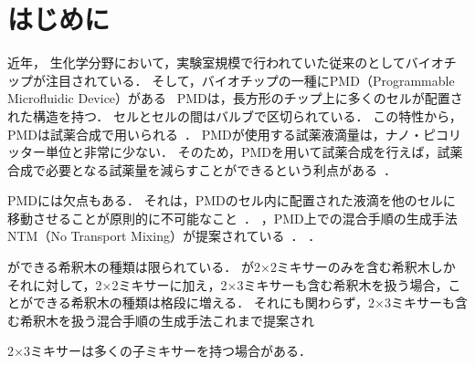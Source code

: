 \chapter{はじめに}
近年， 生化学分野において，実験室規模で行われていた従来のとしてバイオチップが注目されている．
そして，バイオチップの一種にPMD（Programmable Microfluidic Device）がある~\cite{1}
PMDは，長方形のチップ上に多くのセルが配置された構造を持つ．
セルとセルの間はバルブで区切られている．
この特性から，PMDは試薬合成で用いられる~\cite{2}．
PMDが使用する試薬液滴量は，ナノ・ピコリッター単位と非常に少ない．
そのため，PMDを用いて試薬合成を行えば，試薬合成で必要となる試薬量を減らすことができるという利点がある~\cite{1}．

PMDには欠点もある．
それは，PMDのセル内に配置された液滴を他のセルに移動させることが原則的に不可能なこと~\cite{FU2015343}．
，PMD上での混合手順の生成手法NTM（No Transport Mixing）が提案されている~\cite{4}．
．

ができる希釈木の種類は限られている．
が2$\times$2ミキサーのみを含む希釈木しか
それに対して，2$\times$2ミキサーに加え，2$\times$3ミキサーも含む希釈木を扱う場合，ことができる希釈木の種類は格段に増える．
それにも関わらず，2$\times$3ミキサーも含む希釈木を扱う混合手順の生成手法これまで提案され

2$\times$3ミキサーは多くの子ミキサーを持つ場合がある．

